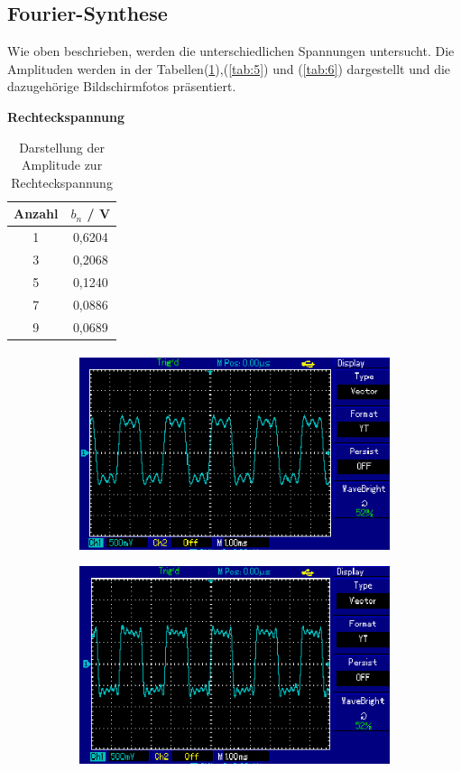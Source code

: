 \subsection{Fourier-Synthese}
Wie oben beschrieben, werden die unterschiedlichen Spannungen untersucht.
Die Amplituden werden in der Tabellen(\ref{tab:4}),(\ref{tab:5}) und (\ref{tab:6}) dargestellt und die dazugehörige Bildschirmfotos präsentiert.\\
\centerline{\textbf{Rechteckspannung}}
\begin{table}[H]
  \centering
  \begin{tabular}{c c}
    \toprule
    Anzahl & $b_n$ / V \\
    \midrule
    1 & 0,6204 \\
    3 & 0,2068 \\
    5 & 0,1240 \\
    7 & 0,0886 \\
    9 & 0,0689 \\
    \bottomrule
  \end{tabular}
  \caption{Darstellung der Amplitude zur Rechteckspannung}
  \label{tab:4}
\end{table}
\begin{figure}[H]
  \centering
  \begin{subfigure}{0.48\textwidth}
	\includegraphics[width=\textwidth]{Rechteckspannung/1.png}
\end{subfigure}
\begin{subfigure}{0.48\textwidth}
  \includegraphics[width=\textwidth]{Rechteckspannung/3.png}
\end{subfigure}
\end{figure}

